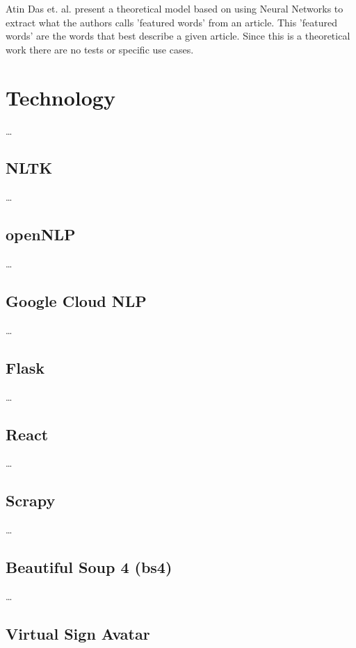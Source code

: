 Atin Das et. al.\cite{das2008neural} present a theoretical model based on using Neural Networks to extract what the authors calls 'featured words' from an article.
This 'featured words' are the words that best describe a given article.
Since this is a theoretical work there are no tests or specific use cases.

\section{Technology}

\dots

\subsection{NLTK}

\dots

\subsection{openNLP}

\dots

\subsection{Google Cloud NLP}

\dots

\subsection{Flask}

\dots

\subsection{React}

\dots

\subsection{Scrapy}

\dots

\subsection{Beautiful Soup 4 (bs4)}

\dots

\subsection{Virtual Sign Avatar}

